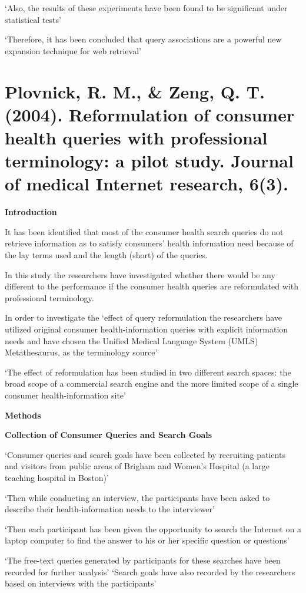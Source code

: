 \documentclass[]{article}
\begin{document}
{{‘Also, the results of these experiments have been found to be significant under statistical tests’

‘Therefore, it has been concluded that query associations are a powerful new expansion technique for web retrieval’

\section{Plovnick, R. M., & Zeng, Q. T. (2004). Reformulation of consumer health queries with professional terminology: a pilot study. Journal of medical Internet research, 6(3).}

\textbf{Introduction}

It has been identified that most of the consumer health search queries do not retrieve information as to satisfy consumers’ health information need because of the lay terms used and the length (short) of the queries.

In this study the researchers have investigated whether there would be any different to the performance if the consumer health queries are reformulated with professional terminology. 

In order to investigate the ‘effect of query reformulation the researchers have utilized original consumer health-information queries with explicit information needs and have chosen the Unified Medical Language System (UMLS) Metathesaurus, as the terminology source’

‘The effect of reformulation has been studied in two different search spaces: the broad scope of a commercial search engine and the more limited scope of a single consumer health-information site’

\textbf{Methods}

\textbf{Collection of Consumer Queries and Search Goals}

‘Consumer queries and search goals have been collected by recruiting patients and visitors from public areas of Brigham and Women's Hospital (a large teaching hospital in Boston)’

‘Then while conducting an interview, the participants have been asked to describe their health-information needs to the interviewer’

‘Then each participant has been given the opportunity to search the Internet on a laptop computer to find the answer to his or her specific question or questions’

‘The free-text queries generated by participants for these searches have been recorded for further analysis’
‘Search goals have also recorded by the researchers based on interviews with the participants’

}}
\end{document}
